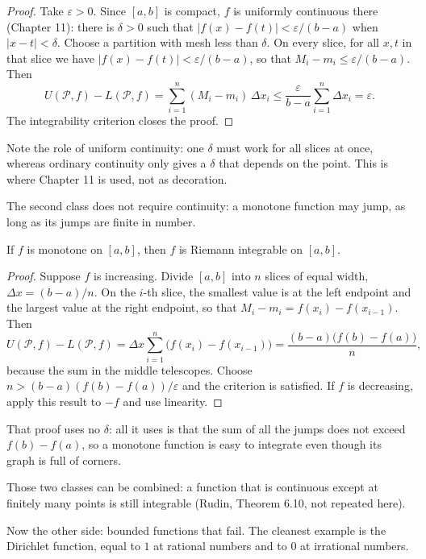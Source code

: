 \begin{proof}
Take $\varepsilon>0$. Since $[a,b]$ is compact, $f$ is uniformly continuous there (Chapter 11):
there is $\delta>0$ such that $|f(x)-f(t)|<\varepsilon/(b-a)$ when $|x-t|<\delta$. Choose
a partition with mesh less than $\delta$. On every slice, for all $x,t$ in
that slice we have $|f(x)-f(t)|<\varepsilon/(b-a)$, so that
$M_i-m_i\le\varepsilon/(b-a)$. Then
\[
U(\mathcal{P},f)-L(\mathcal{P},f)
=\sum_{i=1}^{n}(M_i-m_i)\,\Delta x_i
\le\frac{\varepsilon}{b-a}\sum_{i=1}^{n}\Delta x_i=\varepsilon .
\]
The integrability criterion closes the proof.
\end{proof}

Note the role of uniform continuity: one $\delta$ must work for all slices
at once, whereas ordinary continuity only gives a $\delta$ that depends on the
point. This is where Chapter 11 is used, not as decoration.

The second class does not require continuity: a monotone function may jump, as long as
its jumps are finite in number.

\begin{teorema}
If $f$ is monotone on $[a,b]$, then $f$ is Riemann integrable on $[a,b]$.
\end{teorema}

\begin{proof}
Suppose $f$ is increasing. Divide $[a,b]$ into $n$ slices of equal width, $\Delta x=(b-a)/n$.
On the $i$-th slice, the smallest value is at the left endpoint and the largest value at the right
endpoint, so that $M_i-m_i=f(x_i)-f(x_{i-1})$. Then
\[
U(\mathcal{P},f)-L(\mathcal{P},f)
=\Delta x\sum_{i=1}^{n}\bigl(f(x_i)-f(x_{i-1})\bigr)
=\frac{(b-a)\bigl(f(b)-f(a)\bigr)}{n},
\]
because the sum in the middle telescopes. Choose $n>(b-a)(f(b)-f(a))/\varepsilon$ and the criterion
is satisfied. If $f$ is decreasing, apply this result to $-f$ and use linearity.
\end{proof}

That proof uses no $\delta$: all it uses is that the sum of all the jumps does not
exceed $f(b)-f(a)$, so a monotone function is easy to integrate even though its graph is full of
corners.

Those two classes can be combined: a function that is continuous except at finitely many points
is still integrable (Rudin, Theorem 6.10, not repeated here).

Now the other side: bounded functions that fail. The cleanest example is the
Dirichlet function, equal to $1$ at rational numbers and to $0$ at irrational numbers.

